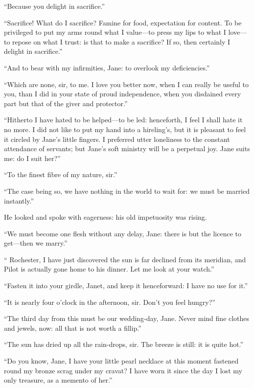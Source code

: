 \enquote{Because you delight in sacrifice.}

\enquote{Sacrifice! What do I sacrifice? Famine for food, expectation
	for content. To be privileged to put my arms round what I value---to
	press my lips to what I love---to repose on what I trust: is that to
	make a sacrifice? If so, then certainly I delight in sacrifice.}

\enquote{And to bear with my infirmities, Jane: to overlook my
	deficiencies.}

\enquote{Which are none, sir, to me. I love you better now, when I can
	really be useful to you, than I did in your state of proud independence,
	when you disdained every part but that of the giver and protector.}

\enquote{Hitherto I have hated to be helped---to be led: henceforth, I
	feel I shall hate it no more. I did not like to put my hand into a
	hireling's, but it is pleasant to feel it circled by Jane's little
	fingers. I preferred utter loneliness to the constant attendance of
	servants; but Jane's soft ministry will be a perpetual joy. Jane suits
	me: do I suit her?}

\enquote{To the finest fibre of my nature, sir.}

\enquote{The case being so, we have nothing in the world to wait for: we
	must be married instantly.}

He looked and spoke with eagerness: his old impetuosity was rising.

\enquote{We must become one flesh without any delay, Jane: there is but
	the licence to get---then we marry.}

\enquote{\Mr{} Rochester, I have just discovered the sun is far declined
	from its meridian, and Pilot is actually gone home to his dinner. Let
	me look at your watch.}

\enquote{Fasten it into your girdle, Janet, and keep it henceforward: I
	have no use for it.}

\enquote{It is nearly four o'clock in the afternoon, sir. Don't you
	feel hungry?}

\enquote{The third day from this must be our wedding-day, Jane. Never
	mind fine clothes and jewels, now: all that is not worth a fillip.}

\enquote{The sun has dried up all the rain-drops, sir. The breeze is
	still: it is quite hot.}

\enquote{Do you know, Jane, I have your little pearl necklace at this
	moment fastened round my bronze scrag under my cravat? I have worn it
	since the day I lost my only treasure, as a memento of her.}

